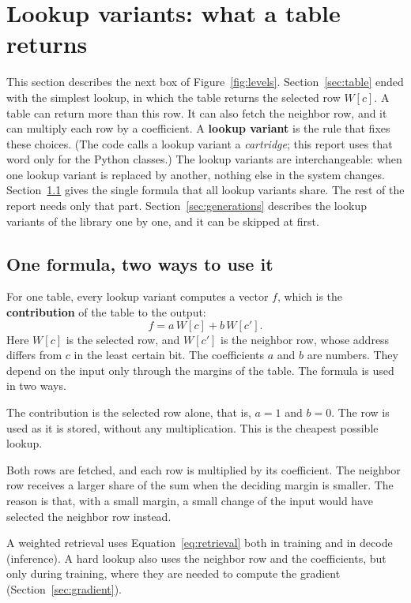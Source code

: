 \documentclass[11pt]{article}
\newcommand{\term}[1]{\textbf{#1}}
\begin{document}
\section{Lookup variants: what a table returns}
\label{sec:variants}

This section describes the next box of Figure~\ref{fig:levels}. Section~\ref{sec:table} ended with the
simplest lookup, in which the table returns the selected row $W[c]$. A table can return more than this
row. It can also fetch the neighbor row, and it can multiply each row by a coefficient. A \term{lookup
variant} is the rule that fixes these choices. (The code calls a lookup variant a \emph{cartridge}; this
report uses that word only for the Python classes.) The lookup variants are interchangeable: when one
lookup variant is replaced by another, nothing else in the system changes. Section~\ref{sec:oneformula}
gives the single formula that all lookup variants share. The rest of the report needs only that part.
Section~\ref{sec:generations} describes the lookup variants of the library one by one, and it can be
skipped at first.

\subsection{One formula, two ways to use it}
\label{sec:oneformula}

For one table, every lookup variant computes a vector $f$, which is the \term{contribution} of the table to
the output:
\begin{equation}\label{eq:retrieval}
  f=a\,W[c]+b\,W[c'] .
\end{equation}
Here $W[c]$ is the selected row, and $W[c']$ is the neighbor row, whose address differs from $c$ in the
least certain bit. The coefficients $a$ and $b$ are numbers. They depend on the input only through the
margins of the table. The formula is used in two ways.
\begin{description}\itemsep2pt
\item[Hard lookup.] The contribution is the selected row alone, that is, $a=1$ and $b=0$. The row is
  used as it is stored, without any multiplication. This is the cheapest possible lookup.
\item[Weighted retrieval.] Both rows are fetched, and each row is multiplied by its coefficient. The
  neighbor row receives a larger share of the sum when the deciding margin is smaller. The reason is
  that, with a small margin, a small change of the input would have selected the neighbor row instead.
\end{description}
A weighted retrieval uses Equation~\eqref{eq:retrieval} both in training and in decode (inference). A
hard lookup also uses the neighbor row and the coefficients, but only during training, where they are
needed to compute the gradient (Section~\ref{sec:gradient}).
\end{document}
